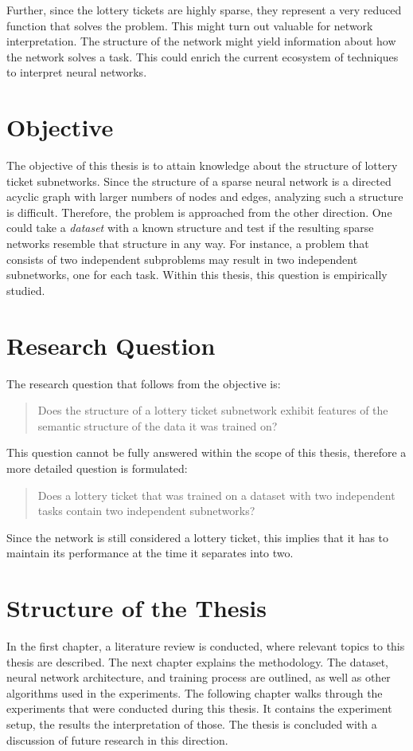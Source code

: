 Further, since the lottery tickets are highly sparse, they represent a very reduced function that solves the problem.
This might turn out valuable for network interpretation.
The structure of the network might yield information about how the network solves a task.
This could enrich the current ecosystem of techniques to interpret neural networks.

\section{Objective}
The objective of this thesis is to attain knowledge about the structure of lottery ticket subnetworks.
Since the structure of a sparse neural network is a directed acyclic graph with larger numbers of nodes and edges, analyzing such a structure is difficult.
Therefore, the problem is approached from the other direction.
One could take a \textit{dataset} with a known structure and test if the resulting sparse networks resemble that structure in any way.
For instance, a problem that consists of two independent subproblems may result in two independent subnetworks, one for each task. 
Within this thesis, this question is empirically studied.

\section{Research Question}
The research question that follows from the objective is:

\begin{quote}
    Does the structure of a lottery ticket subnetwork exhibit features of the semantic structure of the data it was trained on?
\end{quote}

This question cannot be fully answered within the scope of this thesis, therefore a more detailed question is formulated:

\begin{quote}
    Does a lottery ticket that was trained on a dataset with two independent tasks contain two independent subnetworks?
 \end{quote}
 Since the network is still considered a lottery ticket, this implies that it has to maintain its performance at the time it separates into two.


\section{Structure of the Thesis}
In the first chapter, a literature review is conducted, where relevant topics to this thesis are described.
The next chapter explains the methodology.
The dataset, neural network architecture, and training process are outlined, as well as other algorithms used in the experiments.
The following chapter walks through the experiments that were conducted during this thesis.
It contains the experiment setup, the results the interpretation of those.
The thesis is concluded with a discussion of future research in this direction.